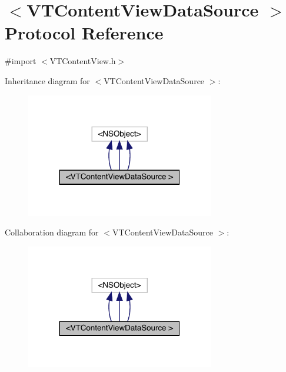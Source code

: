 \hypertarget{protocol_v_t_content_view_data_source_01-p}{}\section{$<$V\+T\+Content\+View\+Data\+Source $>$ Protocol Reference}
\label{protocol_v_t_content_view_data_source_01-p}


{\ttfamily \#import $<$V\+T\+Content\+View.\+h$>$}



Inheritance diagram for $<$V\+T\+Content\+View\+Data\+Source $>$\+:\nopagebreak
\begin{figure}[H]
\begin{center}
\leavevmode
\includegraphics[width=233pt]{protocol_v_t_content_view_data_source_01-p__inherit__graph}
\end{center}
\end{figure}


Collaboration diagram for $<$V\+T\+Content\+View\+Data\+Source $>$\+:\nopagebreak
\begin{figure}[H]
\begin{center}
\leavevmode
\includegraphics[width=233pt]{protocol_v_t_content_view_data_source_01-p__coll__graph}
\end{center}
\end{figure}
